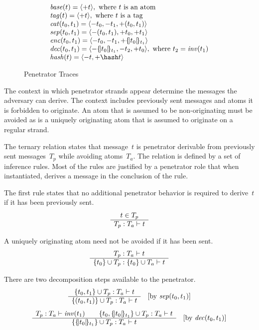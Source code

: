 \documentclass[12pt]{report}
\theoremstyle{definition}
\begin{document}
\begin{figure}
$$\begin{array}{l}
\fn{base}(t)=\seq{\outbnd t},\mbox{ where $t$ is an atom}\\
\fn{tag}(t)=\seq{\outbnd t},\mbox{ where $t$ is a tag}\\
\fn{cat}(t_0,t_1)=\seq{\inbnd t_0,\inbnd t_1, \outbnd(t_0,
  t_1)}\\
\fn{sep}(t_0,t_1)=\seq{\inbnd(t_0, t_1),\outbnd
    t_0,\outbnd t_1}\\
\fn{enc}(t_0,t_1)=\seq{\inbnd t_0,\inbnd t_1,
\outbnd\enc{t_0}{t_1}}\\
\fn{dec}(t_0,t_1)=\seq{\inbnd\enc{t_0}{t_1},
\inbnd t_2,\outbnd t_0},\mbox{ where $t_2=\fn{inv}(t_1)$}\\
\fn{hash}(t)=\seq{\inbnd t,\outbnd\hash t}
\end{array}$$
\caption{Penetrator Traces}\label{fig:pen traces}
\end{figure}

The context in which penetrator strands appear determine the messages
the adversary can derive.  The context includes previously sent
messages and atoms it is forbidden to originate.  An atom that is
assumed to be non-originating must be avoided as is a uniquely
originating atom that is assumed to originate on a regular strand.

The ternary relation  states that message~$t$ is
penetrator derivable from previously sent messages~$T_p$ while
avoiding atoms~$T_a$.  The relation is defined by a set of inference
rules.  Most of the rules are justified by a penetrator role that when
instantiated, derives a message in the conclusion of the rule.

The first rule states that no additional penetrator behavior is required
to derive~$t$ if it has been previously sent.
$$\infer{t\in{T_p}}{\der{t}{T_p}{T_a}}$$

A uniquely originating atom need not be avoided if it has been sent.
\begin{equation}\label{eqn:avoid}
\infer{\der{t}{T_p}{T_a}}%
{\der{t}{\{t_0\}\cup T_p}{\{t_0\}\cup T_a}}
\end{equation}

There are two decomposition steps available to the penetrator.
\begin{equation}\label{eqn:sep}
\infer{\der{t}{\{t_0,t_1\}\cup T_p}{T_a}}%
{\der{t}{\{(t_0,t_1)\}\cup T_p}{T_a}}\quad
[\mbox{by $\fn{sep}(t_0,t_1)$}]
\end{equation}
\begin{equation}\label{eqn:dec}
\infer{\der{\fn{inv}(t_1)}{T_p}{T_a}\qquad
\der{t}{\{t_0,\enc{t_0}{t_1}\}\cup T_p}{T_a}}%
{\der{t}{\{\enc{t_0}{t_1}\}\cup T_p}{T_a}}\quad
[\mbox{by $\fn{dec}(t_0,t_1)$}]
\end{equation}
\end{document}
